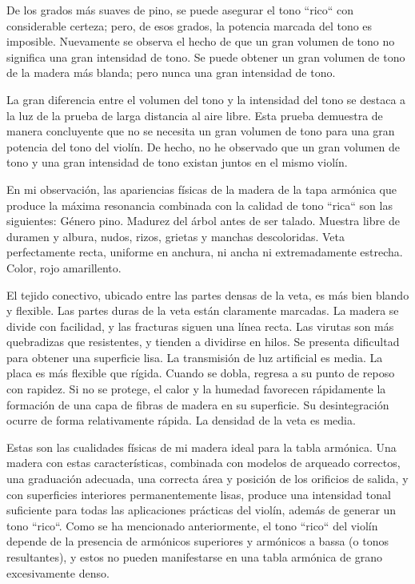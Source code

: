 \documentclass[12pt]{book}
\begin{document}
De los grados más suaves de pino, se puede asegurar el tono ``rico`` con considerable certeza; pero, de esos grados, la potencia marcada del tono es imposible. Nuevamente se observa el hecho de que un gran volumen de tono no significa una gran intensidad de tono. Se puede obtener un gran volumen de tono de la madera más blanda; pero nunca una gran intensidad de tono.

La gran diferencia entre el volumen del tono y la intensidad del tono se destaca a la luz de la prueba de larga distancia al aire libre. Esta prueba demuestra de manera concluyente que no se necesita un gran volumen de tono para una gran potencia del tono del violín. De hecho, no he observado que un gran volumen de tono y una gran intensidad de tono existan juntos en el mismo violín.

En mi observación, las apariencias físicas de la madera de la tapa armónica que produce la máxima resonancia combinada con la calidad de tono ``rica`` son las siguientes: Género pino. Madurez del árbol antes de ser talado. Muestra libre de duramen y albura, nudos, rizos, grietas y manchas descoloridas. Veta perfectamente recta, uniforme en anchura, ni ancha ni extremadamente estrecha. Color, rojo amarillento.

El tejido conectivo, ubicado entre las partes densas de la veta, es más bien blando y flexible.  
Las partes duras de la veta están claramente marcadas.  
La madera se divide con facilidad, y las fracturas siguen una línea recta.  
Las virutas son más quebradizas que resistentes, y tienden a dividirse en hilos.  
Se presenta dificultad para obtener una superficie lisa.  
La transmisión de luz artificial es media.  
La placa es más flexible que rígida.  
Cuando se dobla, regresa a su punto de reposo con rapidez.  
Si no se protege, el calor y la humedad favorecen rápidamente la formación de una capa de fibras de madera en su superficie.  
Su desintegración ocurre de forma relativamente rápida.  
La densidad de la veta es media.  

Estas son las cualidades físicas de mi madera ideal para la tabla armónica. Una madera con estas características, combinada con modelos de arqueado correctos, una graduación adecuada, una correcta área y posición de los orificios de salida, y con superficies interiores permanentemente lisas, produce una intensidad tonal suficiente para todas las aplicaciones prácticas del violín, además de generar un tono ``rico``. Como se ha mencionado anteriormente, el tono ``rico`` del violín depende de la presencia de armónicos superiores y armónicos a bassa (o tonos resultantes), y estos no pueden manifestarse en una tabla armónica de grano excesivamente denso.
\end{document}
